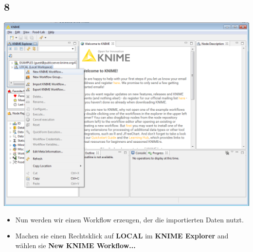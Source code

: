 \documentclass{beamer}
\begin{document}
\subsection{8}
\begin{frame}
	\begin{center}
  		\includegraphics[height=0.6\textheight]{8.png}
	\end{center}
	\begin{itemize}
		\item Nun werden wir einen Workflow erzeugen, der die importierten Daten nutzt.
		\item Machen sie einen Rechtsklick auf \textbf{LOCAL} im \textbf{KNIME Explorer} and wählen sie \textbf{New KNIME Workflow...}
	\end{itemize}
\end{frame}
\end{document}
